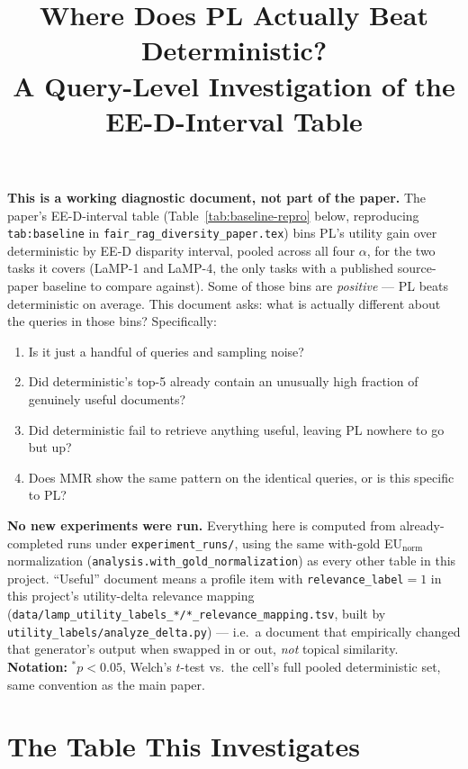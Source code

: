 \documentclass[10pt]{article}
\title{Where Does PL Actually Beat Deterministic?\\A Query-Level Investigation of the EE-D-Interval Table}
\author{}
\date{}
\begin{document}
\maketitle

\noindent\textbf{This is a working diagnostic document, not part of the paper.} The
paper's EE-D-interval table (Table~\ref{tab:baseline-repro} below, reproducing
\texttt{tab:baseline} in \texttt{fair\_rag\_diversity\_paper.tex}) bins PL's utility
gain over deterministic by EE-D disparity interval, pooled across all four
$\alpha$, for the two tasks it covers (LaMP-1 and LaMP-4, the only tasks with a
published source-paper baseline to compare against). Some of those bins are
\emph{positive} --- PL beats deterministic on average. This document asks: what is
actually different about the queries in those bins? Specifically:
\begin{enumerate}
  \item Is it just a handful of queries and sampling noise?
  \item Did deterministic's top-5 already contain an unusually high fraction of
    genuinely useful documents?
  \item Did deterministic fail to retrieve anything useful, leaving PL nowhere to
    go but up?
  \item Does MMR show the same pattern on the identical queries, or is this
    specific to PL?
\end{enumerate}
\textbf{No new experiments were run.} Everything here is computed from already-completed
runs under \texttt{experiment\_runs/}, using the same with-gold EU$_{\text{norm}}$
normalization (\texttt{analysis.with\_gold\_normalization}) as every other table in
this project. ``Useful'' document means a profile item with
\texttt{relevance\_label}${}=1$ in this project's utility-delta relevance mapping
(\texttt{data/lamp\_utility\_labels\_*/*\_relevance\_mapping.tsv}, built by
\texttt{utility\_labels/analyze\_delta.py}) --- i.e.\ a document that
empirically changed that generator's output when swapped in or out, \emph{not}
topical similarity. \textbf{Notation:} $^*p{<}0.05$, Welch's $t$-test vs.\ the
cell's full pooled deterministic set, same convention as the main paper.

\section{The Table This Investigates}
\label{sec:source-table}
\end{document}

